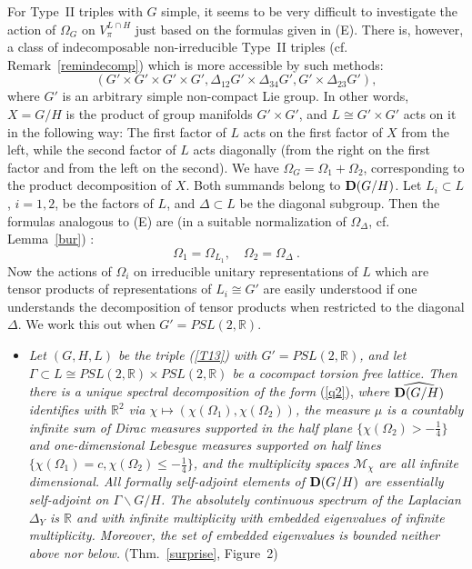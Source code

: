\documentclass[10]{amsart}
\theoremstyle{remark}
\theoremstyle{definition}
\numberwithin{equation}{section}
\newcommand{\R}{\mathbb{R}}           %
\begin{document}
For Type~II triples with $G$ simple, it seems to be very difficult to investigate the action of $\Omega_G$ on $V_\pi^{L\cap H}$ just based on the formulas given in ({E}).
There is, however, a class of indecomposable non-irreducible Type~II triples (cf. Remark~\ref{remindecomp}) which is more accessible by such methods:
\begin{equation}\label{T13} 
(G'\times G'\times G'\times G',\Delta_{12} G'\times \Delta_{34} G', G'\times \Delta_{23} G'),
\end{equation}
where $G'$ is an arbitrary simple non-compact Lie group. In other words, $X=G/H$ is the product of group manifolds $G'\times G'$, and $L\cong G'\times G'$ acts on it in the following way:
The first factor of $L$ acts on the first factor of $X$ from the left, while the second factor of $L$ acts diagonally (from the right on the first factor and from the left on the second). 
We have $\Omega_G=\Omega_1+\Omega_2$, corresponding to the product decomposition of $X$. Both summands belong to ${\bf D}(G/H)$. Let $L_i\subset L$, $i=1,2$,  be the factors
of $L$, and $\Delta\subset L$ be the diagonal subgroup. Then the formulas analogous to ({E}) are  (in a suitable normalization of $\Omega_\Delta$, cf. Lemma~\ref{bur}) :
$$ \Omega_1=\Omega_{L_1},\quad \Omega_2 =\Omega_\Delta\ .$$
Now the actions of $\Omega_i$ on irreducible unitary representations of $L$ which are tensor products of representations
of $L_i\cong G'$ are easily understood if one understands the decomposition of tensor products when restricted to the diagonal $\Delta$.
We work this out when $G'=PSL(2,\R)$.
\begin{itemize}
\item[({\bf G})] {\em Let $(G,H,L)$ be the triple (\ref{T13}) with $G'=PSL(2,\R)$, and let $\Gamma\subset L\cong PSL(2,\R)\times PSL(2,\R)$ be a cocompact torsion free lattice. Then there is a unique spectral decomposition of the form} (\ref{q2}),
{\em where $\widehat{{\bf D}(G/H)}$ identifies with $\R^2$ via $\chi\mapsto (\chi(\Omega_1),\chi(\Omega_2))$, the measure $\mu$ is a countably infinite sum of Dirac measures supported in the half plane $\{\chi(\Omega_2)>-\frac{1}{4}\}$ and one-dimensional Lebesgue measures supported on half lines $\{\chi(\Omega_1)=c, \chi(\Omega_2)\le-\frac{1}{4}\}$, and the
multiplicity spaces ${\mathcal M}_\chi$ are all infinite dimensional.
All formally self-adjoint elements of ${\bf D}(G/H)$ are essentially self-adjoint on $\Gamma\backslash G/H$.
The absolutely continuous spectrum of the Laplacian $\Delta_Y$ is $\R$ and with infinite multiplicity with embedded eigenvalues of infinite multiplicity. Moreover, the set of embedded eigenvalues is bounded neither above nor below.} (Thm.~\ref{surprise}, Figure~2)
\end{itemize}
\end{document}
